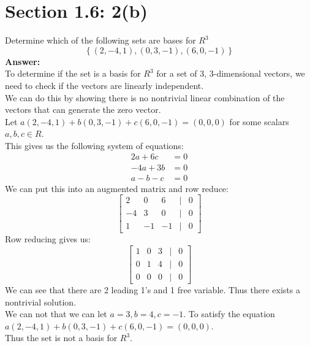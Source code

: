 \documentclass{article}
\begin{document}
\section*{Section 1.6: 2(b)}
Determine which of the following sets are bases for $R^3$ 
$$ \left\{ (2,-4,1), (0,3,-1), (6, 0, -1)\right\}$$
\textbf{Answer:} \\
To determine if the set is a basis for $R^3$ for a set of 3, 3-dimensional vectors, we need to check if the vectors are linearly independent.\\
We can do this by showing there is no nontrivial linear combination of the vectors that can generate the zero vector.\\
Let $a(2,-4,1) + b(0,3,-1) + c(6,0,-1) = (0,0,0)$ for some scalars $a,b,c \in R$.\\
This gives us the following system of equations:
\begin{align*}
    2a + 6c &= 0 \\
    -4a + 3b &= 0 \\
    a - b - c &= 0
\end{align*}
We can put this into an augmented matrix and row reduce:
$$ \begin{bmatrix}
    2 & 0 & 6 & | & 0 \\
    -4 & 3 & 0 & | & 0 \\
    1 & -1 & -1 & | & 0
\end{bmatrix}$$
Row reducing gives us:
$$ \begin{bmatrix}
    1 & 0 & 3 & | & 0 \\
    0 & 1 & 4 & | & 0 \\
    0 & 0 & 0 & | & 0
\end{bmatrix}$$
We can see that there are 2 leading 1's and 1 free variable. Thus there exists a nontrivial solution. \\
We can not that we can let $a = 3, b = 4, c = -1$. To satisfy the equation $a(2,-4,1) + b(0,3,-1) + c(6,0,-1) = (0,0,0)$.\\
Thus the set is not a basis for $R^3$.\\
\end{document}
